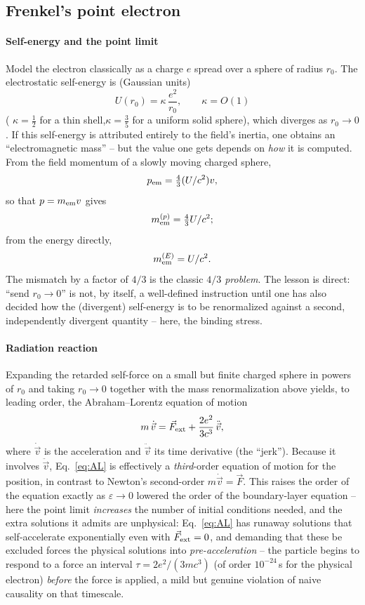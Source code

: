 \subsection{Frenkel's point electron}

\paragraph{Self-energy and the point limit}

Model the electron classically as a charge $e$ spread over a
sphere of radius $r_0$. The electrostatic self-energy is
(Gaussian units)
\begin{equation}
U(r_0) = \kappa\,\frac{e^2}{r_0}, \qquad \kappa = O(1)
\end{equation}
( $\kappa=\tfrac12$ for a thin shell,$\kappa=\tfrac35$ for a 
uniform solid sphere),
which diverges as $r_0\to0$. If this self-energy is attributed
entirely to the field's inertia, one obtains an
``electromagnetic mass'' -- but the value one gets depends on
\emph{how} it is computed. From the field momentum of a slowly
moving charged sphere,
\[p_{\rm em}=\tfrac{4}{3}(U/c^2)v,\]
so that $p=m_{\rm em}v$ gives 
\[m_{\rm em}^{(p)}=\tfrac{4}{3}U/c^2;\]
from the energy directly, 
\[m_{\rm em}^{(E)}=U/c^2.\]
The mismatch
by a factor of $4/3$ is the classic \emph{$4/3$ problem}.
The lesson is direct:
``send $r_0\to0$'' is not, by itself, a
well-defined instruction until one has also decided how the
(divergent) self-energy is to be renormalized against a second,
independently divergent quantity -- here, the binding stress.

\paragraph{Radiation reaction}

Expanding the retarded self-force on a small but finite charged sphere in
powers of $r_0$ and taking $r_0\to0$ together with the mass renormalization
above yields, to leading order, the Abraham--Lorentz equation of motion
\begin{equation}
m\,\dot{\vec v} = \vec F_{\rm ext} + \frac{2e^2}{3c^3}\,\ddot{\vec v},
\label{eq:AL}
\end{equation}
where $\dot{\vec v}$ is the acceleration and $\ddot{\vec v}$ its
time derivative (the ``jerk''). Because it involves $\ddot{\vec
v}$, Eq.~\eqref{eq:AL} is effectively a \emph{third}-order
equation of motion for the position, in contrast to Newton's
second-order $m\dot{\vec v}=\vec F$. This raises the order of the
equation exactly as $\varepsilon\to0$ lowered the order of the
boundary-layer equation -- here the point limit
\emph{increases} the number of initial conditions needed, and
the extra solutions it admits are unphysical: Eq.~\eqref{eq:AL}
has runaway solutions that self-accelerate exponentially even
with $\vec F_{\rm ext}=0$, and demanding that these be excluded
forces the physical solutions into \emph{pre-acceleration} --
the particle begins to respond to a force an interval
$\tau=2e^2/(3mc^3)$ (of order $10^{-24}\,$s for the physical
electron) \emph{before} the force is applied, a mild but genuine
violation of naive causality on that timescale.

